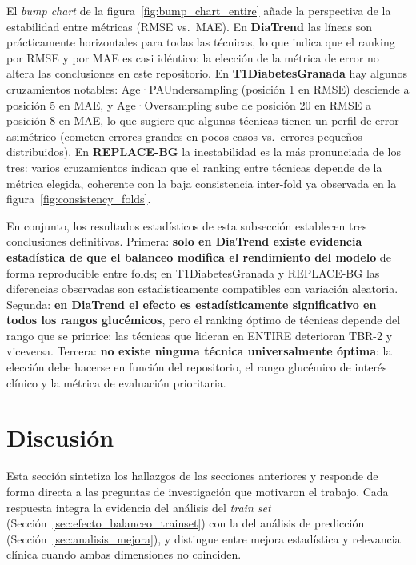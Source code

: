 El \textit{bump chart} de la figura~\ref{fig:bump_chart_entire} añade
la perspectiva de la estabilidad entre métricas (RMSE vs.\ MAE).
En \textbf{DiaTrend} las líneas son prácticamente horizontales para
todas las técnicas, lo que indica que el ranking por RMSE y por MAE
es casi idéntico: la elección de la métrica de error no altera las
conclusiones en este repositorio. En \textbf{T1DiabetesGranada} hay
algunos cruzamientos notables: Age·PAUndersampling (posición 1 en RMSE)
desciende a posición 5 en MAE, y Age·Oversampling sube de posición 20
en RMSE a posición 8 en MAE, lo que sugiere que algunas técnicas tienen
un perfil de error asimétrico (cometen errores grandes en pocos casos
vs.\ errores pequeños distribuidos). En \textbf{REPLACE-BG} la
inestabilidad es la más pronunciada de los tres: varios cruzamientos
indican que el ranking entre técnicas depende de la métrica elegida,
coherente con la baja consistencia inter-fold ya observada en la
figura~\ref{fig:consistency_folds}.

En conjunto, los resultados estadísticos de esta subsección establecen
tres conclusiones definitivas. Primera: \textbf{solo en DiaTrend existe
evidencia estadística de que el balanceo modifica el rendimiento del
modelo} de forma reproducible entre folds; en T1DiabetesGranada y
REPLACE-BG las diferencias observadas son estadísticamente compatibles
con variación aleatoria. Segunda: \textbf{en DiaTrend el efecto es
estadísticamente significativo en todos los rangos glucémicos}, pero el
ranking óptimo de técnicas depende del rango que se priorice: las
técnicas que lideran en ENTIRE deterioran TBR-2 y viceversa. Tercera:
\textbf{no existe ninguna técnica universalmente óptima}: la elección
debe hacerse en función del repositorio, el rango glucémico de interés
clínico y la métrica de evaluación prioritaria.


\section{Discusión}
\label{sec:discusion}

Esta sección sintetiza los hallazgos de las secciones anteriores y responde de
forma directa a las preguntas de investigación que motivaron el trabajo. Cada
respuesta integra la evidencia del análisis del \textit{train set}
(Sección~\ref{sec:efecto_balanceo_trainset}) con la del análisis de predicción
(Sección~\ref{sec:analisis_mejora}), y distingue entre mejora estadística y
relevancia clínica cuando ambas dimensiones no coinciden.

